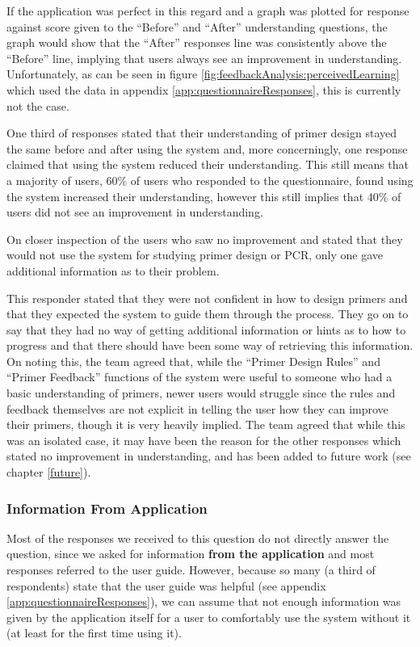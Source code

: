 If the application was perfect in this regard and a graph was plotted
for response against score given to the ``Before'' and ``After''
understanding questions, the graph would show that the ``After''
responses line was consistently above the ``Before'' line, implying
that users always see an improvement in understanding.
Unfortunately, as can be seen in figure
\ref{fig:feedbackAnalysis:perceivedLearning} which used the data in
appendix \ref{app:questionnaireResponses}, this is currently not the
case.

One third of responses stated that their understanding of primer
design stayed the same before and after using the system and, more
concerningly, one response claimed that using the system reduced their
understanding.
This still means that a majority of users, 60\% of users who responded
to the questionnaire, found using the system increased their
understanding, however this still implies that 40\% of users did not
see an improvement in understanding.

On closer inspection of the users who saw no improvement and stated
that they would not use the system for studying primer design or PCR,
only one gave additional information as to their problem.

This responder stated that they were not confident in how to design
primers and that they expected the system to guide them through the
process.
They go on to say that they had no way of getting additional
information or hints as to how to progress and that there should have
been some way of retrieving this information.
On noting this, the team agreed that, while the ``Primer Design
Rules'' and ``Primer Feedback'' functions of the system were useful to
someone who had a basic understanding of primers, newer users would
struggle since the rules and feedback themselves are not explicit
in telling the user how they can improve their primers, though it is
very heavily implied.
The team agreed that while this was an isolated case, it may have been
the reason for the other responses which stated no improvement in
understanding, and has been added to future work (see chapter
\ref{future}).

\subsubsection{Information From Application}
Most of the responses we received to this question do not directly
answer the question, since we asked for information \textbf{from the
  application} and most responses referred to the user guide.
However, because so many (a third of respondents) state that the user
guide was helpful (see appendix \ref{app:questionnaireResponses}), we
can assume that not enough information was given by the application
itself for a user to comfortably use the system without it (at least
for the first time using it).

